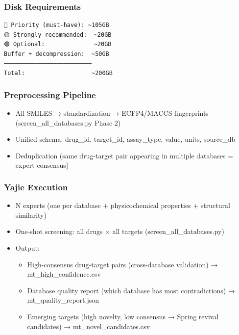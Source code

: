 \documentclass[
  12pt,
]{article}
\providecommand{\tightlist}{%
  \setlength{\itemsep}{0pt}\setlength{\parskip}{0pt}}
\begin{document}
\subsubsection{Disk Requirements}\label{disk-requirements}

\begin{verbatim}
🔴 Priority (must-have): ~105GB
🟡 Strongly recommended:  ~20GB
🟢 Optional:              ~20GB
Buffer + decompression:  ~50GB
─────────────────────────
Total:                   ~200GB
\end{verbatim}

\subsubsection{Preprocessing Pipeline}\label{preprocessing-pipeline}

\begin{itemize}
\tightlist
\item[$\boxtimes$]
  All SMILES → standardization → ECFP4/MACCS fingerprints (screen\_all\_databases.py Phase 2)
\item[$\boxtimes$]
  Unified schema: drug\_id, target\_id, assay\_type, value, units, source\_db
\item[$\boxtimes$]
  Deduplication (same drug-target pair appearing in multiple databases = expert consensus)
\end{itemize}

\subsubsection{Yajie Execution}\label{yajie-execution}

\begin{itemize}
\tightlist
\item[$\boxtimes$]
  N experts (one per database + physicochemical properties + structural similarity)
\item[$\boxtimes$]
  One-shot screening: all drugs × all targets (screen\_all\_databases.py)
\item[$\boxtimes$]
  Output:

  \begin{itemize}
  \tightlist
  \item
    High-consensus drug-target pairs (cross-database validation) → mt\_high\_confidence.csv
  \item
    Database quality report (which database has most contradictions) → mt\_quality\_report.json
  \item
    Emerging targets (high novelty, low consensus → Spring revival candidates) → mt\_novel\_candidates.csv
  \end{itemize}
\end{itemize}
\end{document}
